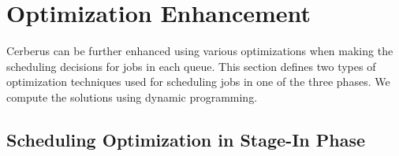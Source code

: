 % 


\section{Optimization Enhancement}
\label{Sec:Opt}

Cerberus can be further enhanced using various optimizations when making the scheduling decisions for jobs in each queue. This section defines two types of optimization techniques used for scheduling jobs in one of the three phases. We compute the solutions using dynamic programming.

\subsection{Scheduling Optimization in Stage-In Phase}

